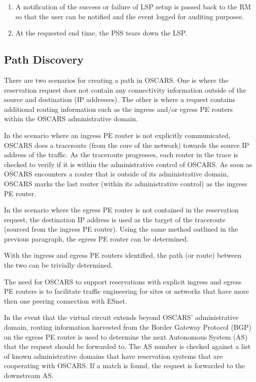 \documentclass[conference]{IEEEtran}
\begin{document}
\begin{enumerate}
\item
A notification of the success or failure of LSP setup is 
passed back to the RM so that the user can be notified and the event 
logged for auditing purposes.

\item
At the requested end time, the PSS tears down the LSP.
\end{enumerate}

\subsection{Path Discovery}
There are two scenarios for creating a path in OSCARS.  One is where the
reservation request does not contain any connectivity information outside of
the source and destination (IP addresses).  The other is where a request
contains additional routing information such as the ingress and/or egress 
PE routers within the OSCARS administrative domain.

In the scenario where an ingress PE router is not explicitly communicated, 
OSCARS does a traceroute (from the core of the network) towards the source IP 
address of the traffic. As the traceroute
progresses, each router in the trace is checked to verify if 
it is within the administrative control of OSCARS. As soon as OSCARS 
encounters a router that
is outside of its administrative domain, OSCARS marks the last router (within 
its administrative control) as the ingress PE router.

In the scenario where the egress PE router is not contained in the reservation 
request, 
the destination IP address is used as the target of the traceroute (sourced 
from the ingress PE router).
Using the same method outlined in the previous paragraph, the egress PE router 
can be determined.

With the ingress and egress PE routers identified, the path (or route) between 
the two can be trivially determined.

The need for OSCARS to support reservations with explicit ingress and egress PE
routers is to
facilitate traffic engineering for sites or networks that have more then one 
peering connection with ESnet.

In the event that the virtual circuit extends beyond OSCARS' administrative 
domain,
routing information harvested from the Border Gateway Protocol 
(BGP) on the egress PE router is used to determine the next
Autonomous System (AS) that the request should be forwarded 
to.   The AS number is
checked against a list of known administrative domains that have reservation 
systems
that are cooperating with OSCARS.  If a match is found, the request is 
forwarded to the downstream AS.
\end{document}
